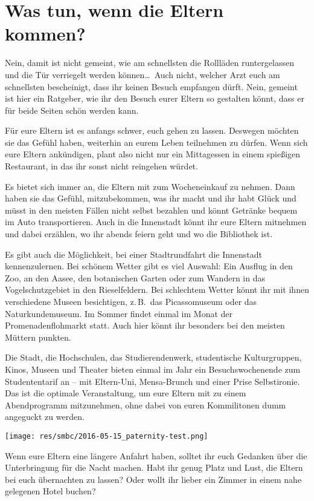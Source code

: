 \section{Was tun, wenn die Eltern kommen?}
\begin{multicols}{2}
Nein, damit ist nicht gemeint, wie am schnellsten die Rollläden runtergelassen und die Tür verriegelt werden können\dots\
Auch nicht, welcher Arzt euch am schnellsten bescheinigt, dass ihr keinen Besuch empfangen dürft.
Nein, gemeint ist hier ein Ratgeber, wie ihr den Besuch eurer Eltern so gestalten könnt, dass er für beide Seiten schön werden kann.

\begin{center}
\end{center}

Für eure Eltern ist es anfangs schwer, euch gehen zu lassen.
Deswegen möchten sie das Gefühl haben, weiterhin an eurem Leben teilnehmen zu dürfen.
Wenn sich eure Eltern ankündigen, plant also nicht nur ein Mittagessen in einem spießigen Restaurant, in das ihr sonst nicht reingehen würdet.

Es bietet sich immer an, die Eltern mit zum Wocheneinkauf zu nehmen.
Dann haben sie das Gefühl, mitzubekommen, was ihr macht und ihr habt Glück und müsst in den meisten Fällen nicht selbst bezahlen und könnt Getränke bequem im Auto transportieren.
Auch in die Innenstadt könnt ihr eure Eltern mitnehmen und dabei erzählen, wo ihr abends feiern geht und wo die Bibliothek ist.

Es gibt auch die Möglichkeit, bei einer Stadtrundfahrt die Innenstadt kennenzulernen.
Bei schönem Wetter gibt es viel Auswahl: Ein Ausflug in den Zoo, an den Aasee, den botanischen Garten oder zum Wandern in das Vogelschutzgebiet in den Rieselfeldern.
Bei schlechtem Wetter könnt ihr mit ihnen verschiedene Museen besichtigen, z.\,B.\ das Picassomuseum oder das Naturkundemuseum.
Im Sommer findet einmal im Monat der Promenadenflohmarkt statt.
Auch hier könnt ihr besonders bei den meisten Müttern punkten.

Die Stadt, die Hochschulen, das Studierendenwerk, studentische Kulturgruppen, Kinos, Museen und Theater bieten einmal im Jahr ein Besuchswochenende zum Studententarif an – mit Eltern-Uni, Mensa-Brunch und einer Prise Selbstironie.
Das ist die optimale Veranstaltung, um eure Eltern mit zu einem Abendprogramm mitzunehmen, ohne dabei von euren Kommilitonen dumm angeguckt zu werden.

\begin{center}
	\texttt{[image: res/smbc/2016-05-15\_paternity-test.png]}
\end{center}

Wenn eure Eltern eine längere Anfahrt haben, solltet ihr euch Gedanken über die Unterbringung für die Nacht machen.
Habt ihr genug Platz und Lust, die Eltern bei euch übernachten zu lassen? Oder wollt ihr lieber ein Zimmer in einem nahe gelegenen Hotel buchen?

\end{multicols}

\begin{center}
\end{center}
